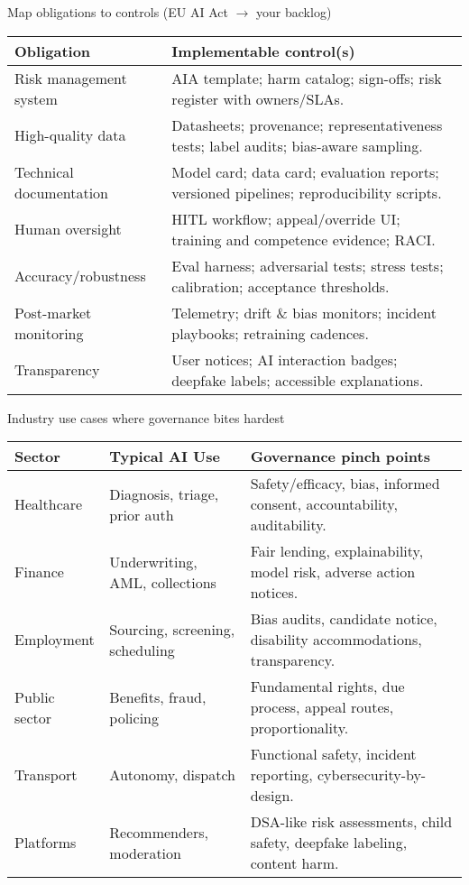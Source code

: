 \documentclass[11pt,aspectratio=169]{beamer}
\begin{document}
\begin{frame}{Map obligations to controls (EU AI Act $\rightarrow$ your backlog)}
\small
\begin{tabular}{p{5.5cm}p{8.2cm}}
\toprule
\textbf{Obligation} & \textbf{Implementable control(s)}\\
\midrule
Risk management system & AIA template; harm catalog; sign-offs; risk register with owners/SLAs.\\
High-quality data & Datasheets; provenance; representativeness tests; label audits; bias-aware sampling.\\
Technical documentation & Model card; data card; evaluation reports; versioned pipelines; reproducibility scripts.\\
Human oversight & HITL workflow; appeal/override UI; training and competence evidence; RACI.\\
Accuracy/robustness & Eval harness; adversarial tests; stress tests; calibration; acceptance thresholds.\\
Post-market monitoring & Telemetry; drift \& bias monitors; incident playbooks; retraining cadences.\\
Transparency & User notices; AI interaction badges; deepfake labels; accessible explanations.\\
\bottomrule
\end{tabular}
\end{frame}

\begin{frame}{Industry use cases where governance bites hardest}
\small
\begin{tabular}{p{3.4cm}p{5.2cm}p{5.3cm}}
\toprule
\textbf{Sector} & \textbf{Typical AI Use} & \textbf{Governance pinch points}\\
\midrule
Healthcare & Diagnosis, triage, prior auth & Safety/efficacy, bias, informed consent, accountability, auditability.\\
Finance & Underwriting, AML, collections & Fair lending, explainability, model risk, adverse action notices.\\
Employment & Sourcing, screening, scheduling & Bias audits, candidate notice, disability accommodations, transparency.\\
Public sector & Benefits, fraud, policing & Fundamental rights, due process, appeal routes, proportionality.\\
Transport & Autonomy, dispatch & Functional safety, incident reporting, cybersecurity-by-design.\\
Platforms & Recommenders, moderation & DSA-like risk assessments, child safety, deepfake labeling, content harm.\\
\bottomrule
\end{tabular}
\end{frame}
\end{document}
